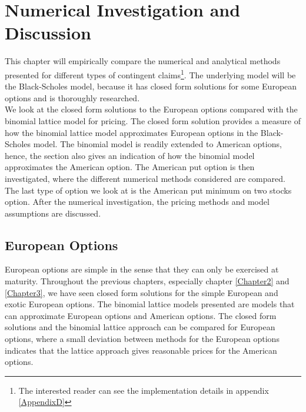 
\chapter{Numerical Investigation and Discussion} %

\label{Chapter6} %

This chapter will empirically compare the numerical and analytical methods presented for different types of contingent claims\footnote{The interested reader can see the implementation details in appendix \ref{AppendixD}}. The underlying model will be the Black-Scholes model, because it has closed form solutions for some European options and is thoroughly researched.\\

We look at the closed form solutions to the European options compared with the binomial lattice model for pricing. The closed form solution provides a measure of how the binomial lattice model approximates European options in the Black-Scholes model. The binomial model is readily extended to American options, hence, the section also gives an indication of how the binomial model approximates the American option. The American put option is then investigated, where the different numerical methods considered are compared. The last type of option we look at is the American put minimum on two stocks option. After the numerical investigation, the pricing methods and model assumptions are discussed.


\section{European Options}\label{EuroOption}
European options are simple in the sense that they can only be exercised at maturity. Throughout the previous chapters, especially chapter \ref{Chapter2} and \ref{Chapter3}, we have seen closed form solutions for the simple European and exotic European options. The binomial lattice models presented are models that can approximate European options and American options. The closed form solutions and the binomial lattice approach can be compared for European options, where a small deviation between methods for the European options indicates that the lattice approach gives reasonable prices for the American options.\\


